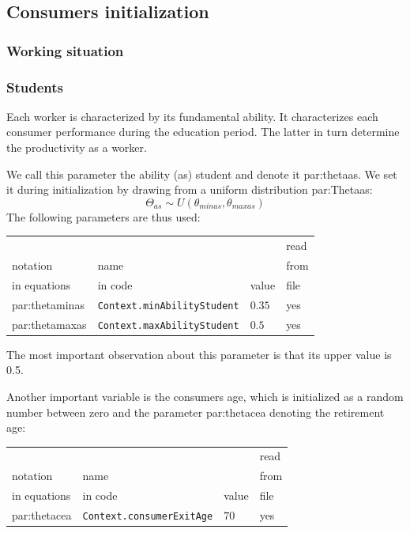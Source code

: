 \documentclass{book}
\begin{document}
\subsection{Consumers initialization}

\subsubsection{Working situation}


\subsubsection*{Students}
\label{pref:tudentevolution}

Each worker is characterized by its fundamental ability. It characterizes each consumer performance during the education period. The latter in turn determine the productivity as a worker.

We call this parameter the ability (as) student and denote it \gls{par:thetaas}. We set it during initialization by drawing from a uniform distribution \gls{par:Thetaas}:
\[
	\Theta_{as}\sim U(\theta_{minas},\theta_{maxas})
\]
The following parameters are thus used:\\
\begin{tabular}{l l l l}
	\hline
	& &&read\\
	notation& name &&from\\
	in equations& in code&value&file\\
	\hline
	\hline
	\gls{par:thetaminas}&\verb+Context.minAbilityStudent+&$0.35$&yes\\
 \gls{par:thetamaxas}&\verb+Context.maxAbilityStudent+&$0.5$&yes\\
	\hline
\end{tabular}

\vskip5mm
The most important observation about this parameter is that its upper value is 0.5.

Another important variable is the consumers age, which is initialized as a random number between zero and the parameter \gls{par:thetacea} denoting the retirement age:\\

\vskip2mm
\noindent
\begin{tabular}{l l l l}
	\hline
	& &&read\\
	notation& name &&from\\
	in equations& in code&value&file\\
	\hline
	\hline
\gls{par:thetacea}&\verb+Context.consumerExitAge+&$70$&yes\\
	\hline
\end{tabular}
\end{document}
